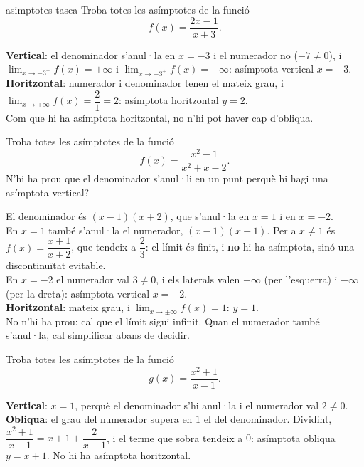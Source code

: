 \begin{apartats}

\begin{tria}{asimptotes-tasca}
Troba totes les asímptotes de la funció
\[
f(x)=\frac{2x-1}{x+3} .
\]

\begin{solucio}
\textbf{Vertical}: el denominador s'anul·la en $x=-3$ i el numerador no ($-7\neq0$), i
$\lim_{x\to-3^-}f(x)=+\infty$ i $\lim_{x\to-3^+}f(x)=-\infty$: asímptota vertical
$\boxed{x=-3}$.\\
\textbf{Horitzontal}: numerador i denominador tenen el mateix grau, i
$\lim_{x\to\pm\infty}f(x)=\dfrac21=2$: asímptota horitzontal $\boxed{y=2}$.\\
Com que hi ha asímptota horitzontal, no n'hi pot haver cap d'obliqua.
\end{solucio}

Troba totes les asímptotes de la funció
\[
f(x)=\frac{x^2-1}{x^2+x-2} .
\]
N'hi ha prou que el denominador s'anul·li en un punt perquè hi hagi una asímptota vertical?

\begin{solucio}
El denominador és $(x-1)(x+2)$, que s'anul·la en $x=1$ i en $x=-2$.\\
En $x=1$ també s'anul·la el numerador, $(x-1)(x+1)$. Per a $x\neq1$ és $f(x)=\dfrac{x+1}{x+2}$, que
tendeix a $\dfrac23$: el límit és finit, i \textbf{no} hi ha asímptota, sinó una discontinuïtat
evitable.\\
En $x=-2$ el numerador val $3\neq0$, i els laterals valen $+\infty$ (per l'esquerra) i $-\infty$ (per
la dreta): asímptota vertical $\boxed{x=-2}$.\\
\textbf{Horitzontal}: mateix grau, i $\lim_{x\to\pm\infty}f(x)=1$: $\boxed{y=1}$.\\
No n'hi ha prou: cal que el límit sigui infinit. Quan el numerador també s'anul·la, cal simplificar
abans de decidir.
\end{solucio}
\end{tria}

\begin{nomesllarg}
Troba totes les asímptotes de la funció
\[
g(x)=\frac{x^2+1}{x-1} .
\]

\begin{solucio}
\textbf{Vertical}: $x=1$, perquè el denominador s'hi anul·la i el numerador val $2\neq0$.\\
\textbf{Obliqua}: el grau del numerador supera en $1$ el del denominador. Dividint,
$\dfrac{x^2+1}{x-1}=x+1+\dfrac{2}{x-1}$, i el terme que sobra tendeix a $0$: asímptota
obliqua $\boxed{y=x+1}$. No hi ha asímptota horitzontal.
\end{solucio}
\end{nomesllarg}


\end{apartats}
